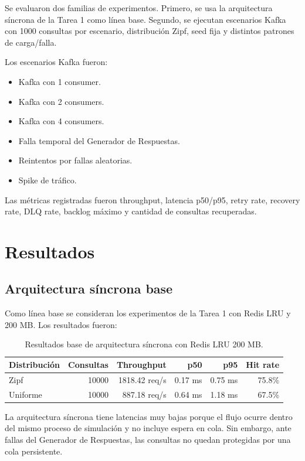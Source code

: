 \documentclass[11pt,letterpaper]{article}
\begin{document}
Se evaluaron dos familias de experimentos. Primero, se usa la arquitectura síncrona de la Tarea 1 como línea base. Segundo, se ejecutan escenarios Kafka con 1000 consultas por escenario, distribución Zipf, seed fija y distintos patrones de carga/falla.

Los escenarios Kafka fueron:

\begin{itemize}
    \item Kafka con 1 consumer.
    \item Kafka con 2 consumers.
    \item Kafka con 4 consumers.
    \item Falla temporal del Generador de Respuestas.
    \item Reintentos por fallas aleatorias.
    \item Spike de tráfico.
\end{itemize}

Las métricas registradas fueron throughput, latencia p50/p95, retry rate, recovery rate, DLQ rate, backlog máximo y cantidad de consultas recuperadas.

\section{Resultados}

\subsection{Arquitectura síncrona base}

Como línea base se consideran los experimentos de la Tarea 1 con Redis LRU y 200 MB. Los resultados fueron:

\begin{table}[H]
\centering
\begin{tabular}{lrrrrr}
\toprule
Distribución & Consultas & Throughput & p50 & p95 & Hit rate \\
\midrule
Zipf & 10000 & 1818.42 req/s & 0.17 ms & 0.75 ms & 75.8\% \\
Uniforme & 10000 & 887.18 req/s & 0.64 ms & 1.18 ms & 67.5\% \\
\bottomrule
\end{tabular}
\caption{Resultados base de arquitectura síncrona con Redis LRU 200 MB.}
\end{table}

La arquitectura síncrona tiene latencias muy bajas porque el flujo ocurre dentro del mismo proceso de simulación y no incluye espera en cola. Sin embargo, ante fallas del Generador de Respuestas, las consultas no quedan protegidas por una cola persistente.
\end{document}
